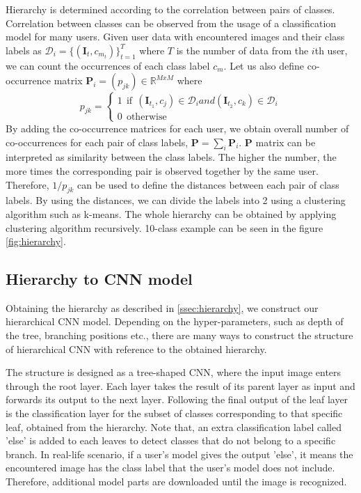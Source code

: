 Hierarchy is determined according to the correlation between pairs of classes. 
Correlation between classes can be observed from the usage of a classification model for many users.
Given user data with encountered images and their class labels as $\mathcal{D}_i = \{(\mathbf{I}_t, c_{m_t})\}_{t=1}^T$ where $T$ is the number of data from the $i$th user, we can count the occurrences of each class label $c_m$.
Let us also define co-occurrence matrix $\mathbf{P}_i = (p_{jk})\in\mathbb{R}^{MxM}$ where
\begin{equation}
p_{jk} =
\begin{cases}
1~~\mathrm{if}~~(\mathbf{I}_{t_1}, c_j)\in\mathcal{D}_i and (\mathbf{I}_{t_2}, c_k)\in\mathcal{D}_i\\
0~~\mathrm{otherwise}
\end{cases}
\end{equation}
By adding the co-occurrence matrices for each user, we obtain overall number of co-occurrences for each pair of class labels, $\mathbf{P} = \sum_i \mathbf{P}_i$.
$\mathbf{P}$ matrix can be interpreted as similarity between the class labels. 
The higher the number, the more times the corresponding pair is observed together by the same user.
Therefore, $1/p_{jk}$ can be used to define the distances between each pair of class labels.
By using the distances, we can divide the labels into 2 using a clustering algorithm such as k-means.
The whole hierarchy can be obtained by applying clustering algorithm recursively.
10-class example can be seen in the figure \ref{fig:hierarchy}.

\subsection{Hierarchy to CNN model}
\label{ssec:hiertoCNN}

Obtaining the hierarchy as described in \ref{ssec:hierarchy}, we construct our hierarchical CNN model. Depending on the hyper-parameters, such as depth of the tree, branching positions etc., there are many ways to construct the structure of hierarchical CNN with reference to the obtained hierarchy.

The structure is designed as a tree-shaped CNN, where the input image enters through the root layer.
Each layer takes the result of its parent layer as input and forwards its output to the next layer. 
Following the final output of the leaf layer is the classification layer for the subset of classes corresponding to that specific leaf, obtained from the hierarchy.
Note that, an extra classification label called 'else' is added to each leaves to detect classes that do not belong to a specific branch.
In real-life scenario, if a user's model gives the output 'else', it means the encountered image has the class label that the user's model does not include.  
Therefore, additional model parts are downloaded until the image is recognized.

